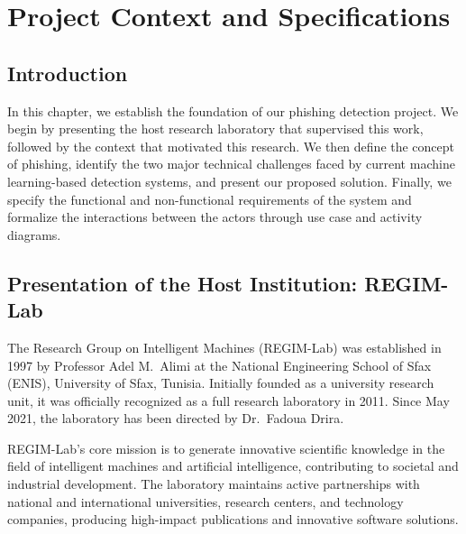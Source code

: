 \chapter{Project Context and Specifications}
\vspace{0.5cm}
\minitoc
\vspace{1cm}

\section*{Introduction}

In this chapter, we establish the foundation of our phishing detection project. We begin by presenting the host research laboratory that supervised this work, followed by the context that motivated this research. We then define the concept of phishing, identify the two major technical challenges faced by current machine learning-based detection systems, and present our proposed solution. Finally, we specify the functional and non-functional requirements of the system and formalize the interactions between the actors through use case and activity diagrams.

\section{Presentation of the Host Institution: REGIM-Lab}

The Research Group on Intelligent Machines (REGIM-Lab) was established in 1997 by Professor Adel M.~Alimi at the National Engineering School of Sfax (ENIS), University of Sfax, Tunisia. Initially founded as a university research unit, it was officially recognized as a full research laboratory in 2011. Since May 2021, the laboratory has been directed by Dr.~Fadoua Drira.

REGIM-Lab's core mission is to generate innovative scientific knowledge in the field of intelligent machines and artificial intelligence, contributing to societal and industrial development. The laboratory maintains active partnerships with national and international universities, research centers, and technology companies, producing high-impact publications and innovative software solutions.

